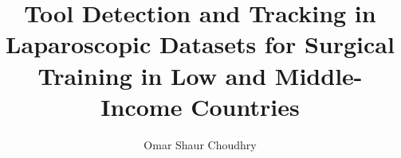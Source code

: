 \documentclass[sigconf, screen, review]{acmart}
\begin{document}
\title[Tool Detection and Tracking in Laparoscopic Datasets for Surgical Training in LMICs]{Tool Detection and Tracking in Laparoscopic Datasets for Surgical Training in Low and Middle-Income Countries}

\author{Omar Shaur Choudhry}

\renewcommand{\shortauthors}{Choudhry}
\end{document}

